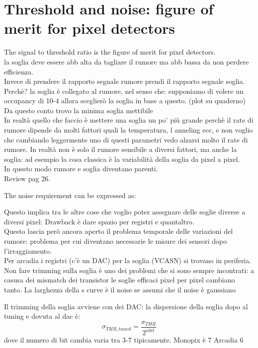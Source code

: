 \section{Threshold and noise: figure of merit for pixel detectors}
The signal to threshold ratio is the figure of merit for pixel detectors.\\

la soglia deve essere abb alta da tagliare il rumore ma abb bassa da non perdere efficienza.\\
Invece di prendere il rapporto segnale rumore prendi il rapporto segnale soglia. Perchè?
la soglia è collegato al rumore, nel senso che: supponiamo di volere un occupancy di 10-4
allora sceglierò la soglia in base a questo. (plot su quaderno)
Da questo conto trovo la minima soglia mettibile\\
In realtà quello che faccio è mettere una soglia un po' più grande perchè il rate di rumore
dipende da molti fattori quali la temperatura, l anneling ecc, e non voglio che cambiando leggermente
uno di questi parametri vedo alzarsi molto il rate di rumore. In realtà non è solo il
rumore sensibile a diversi fattori, ma anche la soglia: ad esempio la cosa classica è
la variabilità della soglia da pixel a pixel.\\
In questo modo rumore e soglia diventano parenti.\\
Review pag 26.

The noise requirement can be expressed as:


Questo implica tra le altre cose che voglio poter assegnare delle soglie diverse
a diversi pixel: Drawback è dare spazio per registri e quantaltro.\\
Questo lascia però ancora aperto il problema temporale delle variazioni del rumore:
problema per cui diventano necessarie le misure dei sensori dopo l'irraggiamento.\\


Per arcadia i registri (c'è un DAC) per la soglia (VCASN) si trovano in periferia.
Non fare trimming sulla soglia è uno dei problemi che si sono sempre incontrati: a casusa dei mismatch dei transistor
le soglie efficaci pixel per pixel cambiano tanto.
La larghezza della s curve è il noise se assumi che il noise è gaussiano


Il trimming della soglia avviene con dei DAC: la dispersione della soglia dopo al tuning e dovuta al dac è: 
\begin{equation}
    \sigma_{THR, tuned} = \frac{\sigma_{THR}}{2^{n bit}}
\end{equation}
dove il numero di bit cambia varia tra 3-7 tipicamente. Monopix è 7 Arcadia 6\\

